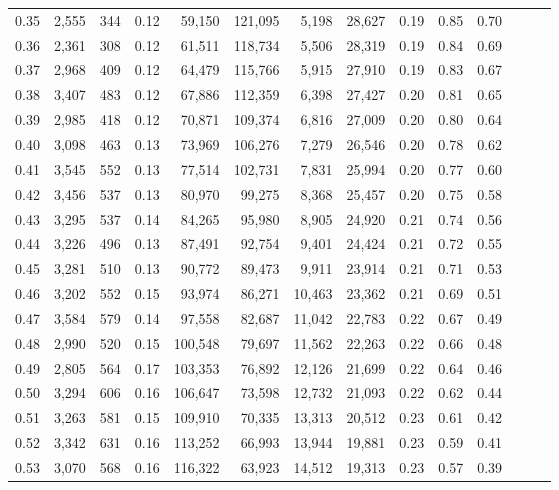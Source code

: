 \begin{tabular}{rrrrrrrrrrrrrr}
0.35 &  2,555 &  344 &  0.12 &   59,150 &  121,095 &   5,198 &  28,627 &  0.19 &  0.85 &      0.70 \\
0.36 &  2,361 &  308 &  0.12 &   61,511 &  118,734 &   5,506 &  28,319 &  0.19 &  0.84 &      0.69 \\
0.37 &  2,968 &  409 &  0.12 &   64,479 &  115,766 &   5,915 &  27,910 &  0.19 &  0.83 &      0.67 \\
0.38 &  3,407 &  483 &  0.12 &   67,886 &  112,359 &   6,398 &  27,427 &  0.20 &  0.81 &      0.65 \\
0.39 &  2,985 &  418 &  0.12 &   70,871 &  109,374 &   6,816 &  27,009 &  0.20 &  0.80 &      0.64 \\
0.40 &  3,098 &  463 &  0.13 &   73,969 &  106,276 &   7,279 &  26,546 &  0.20 &  0.78 &      0.62 \\
0.41 &  3,545 &  552 &  0.13 &   77,514 &  102,731 &   7,831 &  25,994 &  0.20 &  0.77 &      0.60 \\
0.42 &  3,456 &  537 &  0.13 &   80,970 &   99,275 &   8,368 &  25,457 &  0.20 &  0.75 &      0.58 \\
0.43 &  3,295 &  537 &  0.14 &   84,265 &   95,980 &   8,905 &  24,920 &  0.21 &  0.74 &      0.56 \\
0.44 &  3,226 &  496 &  0.13 &   87,491 &   92,754 &   9,401 &  24,424 &  0.21 &  0.72 &      0.55 \\
0.45 &  3,281 &  510 &  0.13 &   90,772 &   89,473 &   9,911 &  23,914 &  0.21 &  0.71 &      0.53 \\
0.46 &  3,202 &  552 &  0.15 &   93,974 &   86,271 &  10,463 &  23,362 &  0.21 &  0.69 &      0.51 \\
0.47 &  3,584 &  579 &  0.14 &   97,558 &   82,687 &  11,042 &  22,783 &  0.22 &  0.67 &      0.49 \\
0.48 &  2,990 &  520 &  0.15 &  100,548 &   79,697 &  11,562 &  22,263 &  0.22 &  0.66 &      0.48 \\
0.49 &  2,805 &  564 &  0.17 &  103,353 &   76,892 &  12,126 &  21,699 &  0.22 &  0.64 &      0.46 \\
0.50 &  3,294 &  606 &  0.16 &  106,647 &   73,598 &  12,732 &  21,093 &  0.22 &  0.62 &      0.44 \\
0.51 &  3,263 &  581 &  0.15 &  109,910 &   70,335 &  13,313 &  20,512 &  0.23 &  0.61 &      0.42 \\
0.52 &  3,342 &  631 &  0.16 &  113,252 &   66,993 &  13,944 &  19,881 &  0.23 &  0.59 &      0.41 \\
0.53 &  3,070 &  568 &  0.16 &  116,322 &   63,923 &  14,512 &  19,313 &  0.23 &  0.57 &      0.39 \\

\end{tabular}
